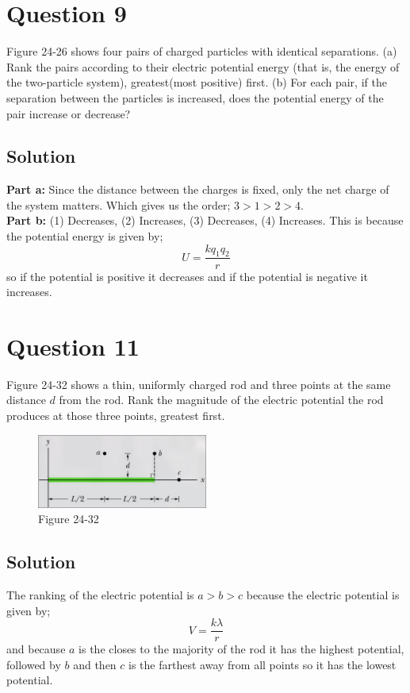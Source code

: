 \documentclass{article}
\begin{document}
\section*{Question 9}
Figure 24-26 shows four pairs of charged particles with identical separations. (a) Rank the pairs according to their electric potential energy (that is, the energy of the two-particle system), greatest(most positive) first. (b) For each pair, if the separation between the particles is increased, does the potential energy of the pair increase or decrease?

\subsection*{Solution}
\textbf{Part a:} Since the distance between the charges is fixed, only the net charge of the system matters. Which gives us the order; $3 > 1 > 2 > 4$.\\[10pt]
\textbf{Part b:} (1) Decreases, (2) Increases, (3) Decreases, (4) Increases. This is because the potential energy is given by;
\begin{equation*}
    U = \frac{kq_1q_2}{r}
\end{equation*}
so if the potential is positive it decreases and if the potential is negative it increases.

\section*{Question 11}
Figure 24-32 shows a thin, uniformly charged rod and three points at the same distance $d$ from the rod. Rank the magnitude of the electric potential the rod produces at those three points, greatest first.

\begin{figure}[h]
	\centering
	\includegraphics[width=0.5\textwidth]{image-3.png}
	\caption{Figure 24-32}
\end{figure}

\subsection*{Solution}
The ranking of the electric potential is $a > b > c$ because the electric potential is given by;
\begin{equation*}
    V = \frac{k\lambda}{r}
\end{equation*}
and because $a$ is the closes to the majority of the rod it has the highest potential, followed by $b$ and then $c$ is the farthest away from all points so it has the lowest potential.
\end{document}
